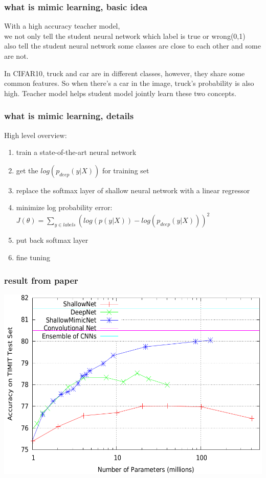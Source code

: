 \documentclass{beamer}
\begin{document}
\begin{frame}
\frametitle{what is mimic learning, basic idea}
With a high accuracy teacher model,\\
we not only tell the student neural network which label is true or wrong(0,1)\\
also tell the student neural network some classes are close to each other and some are not.\\
\begin{example}
In CIFAR10, truck and car are in different classes, however, they share some common features. So when there's a car in the image, truck's probability is also high. Teacher model helps student model jointly learn these two concepts.
\end{example}
\end{frame}

\begin{frame}
\frametitle{what is mimic learning, details}
High level overview:
\begin{enumerate}
\item train a state-of-the-art neural network
\item get the $log(p_{deep}(y|X))$ for training set
\item replace the softmax layer of shallow neural network with a linear regressor
\item minimize log probability error: $J(\theta)=\sum_{y\in labels}(log(p(y|X))-log(p_{deep}(y|X)))^2$
\item put back softmax layer
\item fine tuning
\end{enumerate}
\end{frame}


\begin{frame}
\frametitle{result from paper}
\includegraphics[width=.8\textwidth]{mimic.png}
\end{frame}
\end{document}
